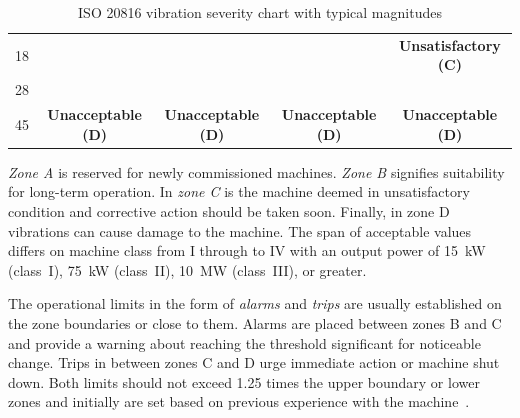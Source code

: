 \begin{table}[h]
\begin{adjustbox}{width=\columnwidth,center}
\begin{tabular}{|c|c|c|c|c|}
18                                                                                   & \cellcolor[HTML]{FD6864}                                                  & \cellcolor[HTML]{FD6864}                                                    & \cellcolor[HTML]{FD6864}                                                                     & \multirow{-2}{*}{\cellcolor[HTML]{F8A102}\textbf{Unsatisfactory (C)}}                         \\ \cline{1-1} \cline{5-5}
28                                                                                   & \cellcolor[HTML]{FD6864}                                                  & \cellcolor[HTML]{FD6864}                                                    & \cellcolor[HTML]{FD6864}                                                                     & \cellcolor[HTML]{FD6864}                                                                      \\ \cline{1-1}
45                                                                                   & \multirow{-5}{*}{\cellcolor[HTML]{FD6864}\textbf{Unacceptable (D)}}       & \multirow{-4}{*}{\cellcolor[HTML]{FD6864}\textbf{Unacceptable (D)}}         & \multirow{-3}{*}{\cellcolor[HTML]{FD6864}\textbf{Unacceptable (D)}}                          & \multirow{-2}{*}{\cellcolor[HTML]{FD6864}\textbf{Unacceptable (D)}}                           \\ \hline
\end{tabular}
\end{adjustbox}
\caption{ISO 20816 vibration severity chart with typical magnitudes \cite{noauthor_iso_2016}}
\label{tab:iso20816-vibration-severity}
\end{table}

\emph{Zone A} is reserved for newly commissioned machines. \emph{Zone B} signifies suitability for long-term operation. In \emph{zone C} is the machine deemed in unsatisfactory condition and corrective action should be taken soon. Finally, in zone D vibrations can cause damage to the machine. The span of acceptable values differs on machine class from I through to IV with an output power of 15~kW (class~I), 75~kW (class~II), 10~MW (class~III), or greater.

The operational limits in the form of \emph{alarms} and \emph{trips} are usually established on the zone boundaries or close to them. Alarms are placed between zones B and C and provide a warning about reaching the threshold significant for noticeable change. Trips in between zones C and D urge immediate action or machine shut down. Both limits should not exceed 1.25 times the upper boundary or lower zones and initially are set based on previous experience with the machine~\cite{noauthor_iso_2002}.

